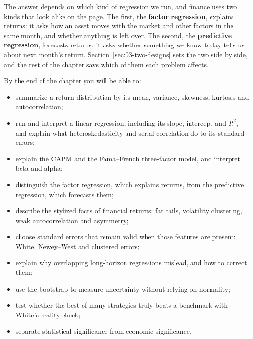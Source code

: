The answer depends on which kind of regression we run, and finance uses two kinds that look alike on the page. The first, the \textbf{factor regression}, explains returns: it asks how an asset moves with the market and other factors in the same month, and whether anything is left over. The second, the \textbf{predictive regression}, forecasts returns: it asks whether something we know today tells us about next month's return. Section~\ref{sec:03-two-designs} sets the two side by side, and the rest of the chapter says which of them each problem affects.

By the end of the chapter you will be able to:

\begin{itemize}
  \item summarize a return distribution by its mean, variance, skewness, kurtosis and autocorrelation;
  \item run and interpret a linear regression, including its slope, intercept and $R^2$, and explain what heteroskedasticity and serial correlation do to its standard errors;
  \item explain the CAPM and the Fama--French three-factor model, and interpret beta and alpha;
  \item distinguish the factor regression, which explains returns, from the predictive regression, which forecasts them;
  \item describe the stylized facts of financial returns: fat tails, volatility clustering, weak autocorrelation and asymmetry;
  \item choose standard errors that remain valid when those features are present: White, Newey--West and clustered errors;
  \item explain why overlapping long-horizon regressions mislead, and how to correct them;
  \item use the bootstrap to measure uncertainty without relying on normality;
  \item test whether the best of many strategies truly beats a benchmark with White's reality check;
  \item separate statistical significance from economic significance.
\end{itemize}

